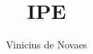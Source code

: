 \documentclass[11pt,aspectratio=43]{beamer}
\author{Vinicius de Novaes}
\title{IPE}
\date{}
\begin{document}
\begin{frame}
\titlepage
\end{frame}

%









\end{document}
